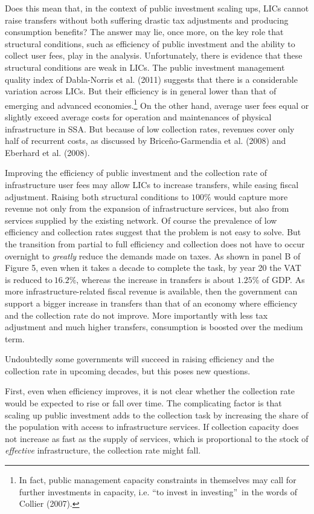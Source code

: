 \documentclass[11pt]{article}
\begin{document}
Does this mean that, in the context of public investment scaling ups, LICs
cannot raise transfers without both suffering drastic tax adjustments and
producing consumption benefits? The answer may lie, once more, on the key
role that structural conditions, such as efficiency of public investment and
the ability to collect user fees, play in the analysis. Unfortunately, there
is evidence that these structural conditions are weak in LICs. The public
investment management quality index of Dabla-Norris et al. (2011) suggests
that there is a considerable variation across LICs. But their efficiency is
in general lower than that of emerging and advanced economies.\footnote{%
\baselineskip=12pt In fact, public management capacity constraints in
themselves may call for further investments in capacity, i.e.
\textquotedblleft to invest in investing\textquotedblright\ in the words of
Collier (2007).} On the other hand, average user fees equal or slightly
exceed average costs for operation and maintenances of physical
infrastructure in SSA. But because of low collection rates, revenues cover
only half of recurrent costs, as discussed by Brice\~{n}o-Garmendia et al.
(2008) and Eberhard et al. (2008).

Improving the efficiency of public investment and the collection rate of
infrastructure user fees may allow LICs to increase transfers, while easing
fiscal adjustment. Raising both structural conditions to $100\%$ would
capture more revenue not only from the expansion of infrastructure services,
but also from services supplied by the existing network. Of course the
prevalence of low efficiency and collection rates suggest that the problem
is not easy to solve. But the transition from partial to full efficiency and
collection does not have to occur overnight to \textit{greatly} reduce the
demands made on taxes. As shown in panel B of Figure 5, even when it takes a
decade to complete the task, by year 20 the VAT is reduced to$\ 16.2\%$,
whereas the increase in transfers is about $1.25\%$ of GDP. As more
infrastructure-related fiscal revenue is available, then the government can
support a bigger increase in transfers than that of an economy where
efficiency and the collection rate do not improve. More importantly with
less tax adjustment and much higher transfers, consumption is boosted over
the medium term.

Undoubtedly some governments will succeed in raising efficiency and the
collection rate in upcoming decades, but this poses new questions.

First, even when efficiency improves, it is not clear whether the collection
rate would be expected to rise or fall over time. The complicating factor is
that scaling up public investment adds to the collection task by increasing
the share of the population with access to infrastructure services. If
collection capacity does not increase as fast as the supply of services,
which is proportional to the stock of \textit{effective} infrastructure, the
collection rate might fall.
\end{document}
